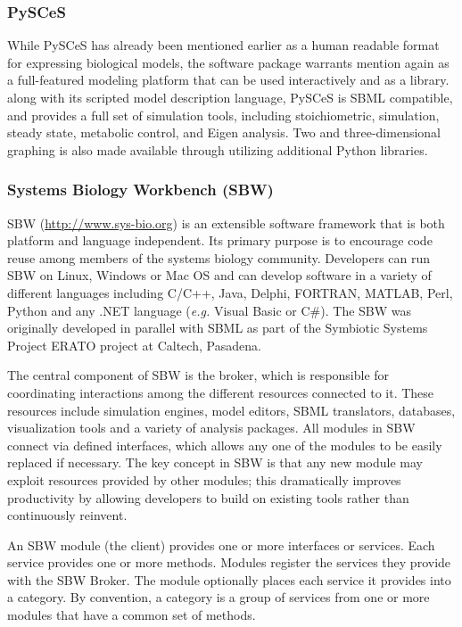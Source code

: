 \subsubsection{PySCeS}

While PySCeS has already been mentioned earlier as a human readable
format for expressing biological models, the software package warrants
mention again as a full-featured modeling platform that can be used
interactively and as a library. along with its scripted model
description language, PySCeS is SBML compatible, and provides a full set
of simulation tools, including stoichiometric, simulation, steady state,
metabolic control, and Eigen analysis. Two and three-dimensional
graphing is also made available through utilizing additional Python
libraries.

\subsubsection{Systems Biology Workbench (SBW)}

SBW (\url{http://www.sys-bio.org}) \autocite{bergmann2006sbw} is an
extensible software framework that is both platform and language
independent. Its primary purpose is to encourage code reuse among
members of the systems biology community. Developers can run SBW on
Linux, Windows or Mac OS and can develop software in a variety of
different languages including C/C++, Java, Delphi, FORTRAN, MATLAB,
Perl, Python and any .NET language (\emph{e.g.} Visual Basic or C\#).
The SBW was originally developed in parallel with SBML as part of the
Symbiotic Systems Project ERATO project at Caltech, Pasadena.

The central component of SBW is the broker, which is responsible for
coordinating interactions among the different resources connected to it.
These resources include simulation engines, model editors, SBML
translators, databases, visualization tools and a variety of analysis
packages. All modules in SBW connect via defined interfaces, which
allows any one of the modules to be easily replaced if necessary. The
key concept in SBW is that any new module may exploit resources provided
by other modules; this dramatically improves productivity by allowing
developers to build on existing tools rather than continuously reinvent.

An SBW module (the client) provides one or more interfaces or services.
Each service provides one or more methods. Modules register the services
they provide with the SBW Broker. The module optionally places each
service it provides into a category. By convention, a category is a
group of services from one or more modules that have a common set of
methods.


